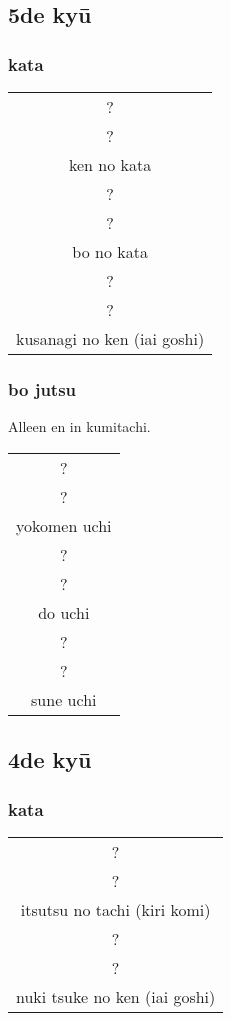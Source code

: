 \documentclass[a4paper, 12pt]{article}
\begin{document}
\subsection{5de ky\={u}}
\subsubsection{kata}
\begin{table}[H]
\begin{center}
\begin{tabular}{c}
    ?\\
    ?\\
    ken no kata\\
    \hline
    ?\\
    ?\\
    bo no kata\\
    \hline
    ?\\
    ?\\
    kusanagi no ken (iai goshi)
\end{tabular}
\end{center}
\label{kyuu_5_katori_kata}
\end{table}

\subsubsection{bo jutsu}
\noindent Alleen en in kumitachi.
\begin{table}[H]
\begin{center}
\begin{tabular}{c}
    ?\\
    ?\\
    yokomen uchi\\
    \hline
    ?\\
    ?\\
    do uchi\\
    \hline
    ?\\
    ?\\
    sune uchi
\end{tabular}
\end{center}
\label{kyuu_5_katori_bo}
\end{table}

\subsection{4de ky\={u}}
\subsubsection{kata}
\begin{table}[H]
\begin{center}
\begin{tabular}{c}
    ?\\
    ?\\
    itsutsu no tachi (kiri komi)\\
    \hline
    ?\\
    ?\\
    nuki tsuke no ken (iai goshi)
\end{tabular}
\end{center}
\label{kyuu_4_katori_kata}
\end{table}
\end{document}
